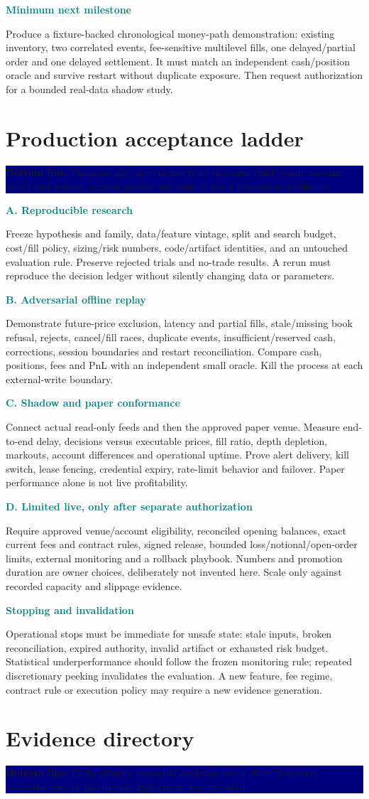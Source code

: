 \documentclass[10pt,letterpaper]{article}
\newcommand{\bl}[1]{\noindent\colorbox{navy}{\parbox{\dimexpr\linewidth-2\fboxsep}{\color{white}\textbf{Bottom line.} #1}}\par\medskip}
\newcommand{\topic}[2]{\clearpage\section{#1}\bl{#2}}
\newcommand{\sub}[1]{\par\textbf{\textcolor{teal}{#1}}\par}
\begin{document}
\sub{Minimum next milestone}
Produce a fixture-backed chronological money-path demonstration: existing inventory, two correlated events, fee-sensitive multilevel fills, one delayed/partial order and one delayed settlement. It must match an independent cash/position oracle and survive restart without duplicate exposure. Then request authorization for a bounded real-data shadow study.
\topic{Production acceptance ladder}{Promote only on evidence from the same child, venue, account policy and release; a green generic test suite is not a promotion certificate.}
\sub{A. Reproducible research}
Freeze hypothesis and family, data/feature vintage, split and search budget, cost/fill policy, sizing/risk numbers, code/artifact identities, and an untouched evaluation rule. Preserve rejected trials and no-trade results. A rerun must reproduce the decision ledger without silently changing data or parameters.
\sub{B. Adversarial offline replay}
Demonstrate future-price exclusion, latency and partial fills, stale/missing book refusal, rejects, cancel/fill races, duplicate events, insufficient/reserved cash, corrections, session boundaries and restart reconciliation. Compare cash, positions, fees and PnL with an independent small oracle. Kill the process at each external-write boundary.
\sub{C. Shadow and paper conformance}
Connect actual read-only feeds and then the approved paper venue. Measure end-to-end delay, decisions versus executable prices, fill ratio, depth depletion, markouts, account differences and operational uptime. Prove alert delivery, kill switch, lease fencing, credential expiry, rate-limit behavior and failover. Paper performance alone is not live profitability.
\sub{D. Limited live, only after separate authorization}
Require approved venue/account eligibility, reconciled opening balances, exact current fees and contract rules, signed release, bounded loss/notional/open-order limits, external monitoring and a rollback playbook. Numbers and promotion duration are owner choices, deliberately not invented here. Scale only against recorded capacity and slippage evidence.
\sub{Stopping and invalidation}
Operational stops must be immediate for unsafe state: stale inputs, broken reconciliation, expired authority, invalid artifact or exhausted risk budget. Statistical underperformance should follow the frozen monitoring rule; repeated discretionary peeking invalidates the evaluation. A new feature, fee regime, contract rule or execution policy may require a new evidence generation.
\topic{Evidence directory}{Paths identify inspected evidence, not a claim that every associated test or production deployment was executed.}
\end{document}
